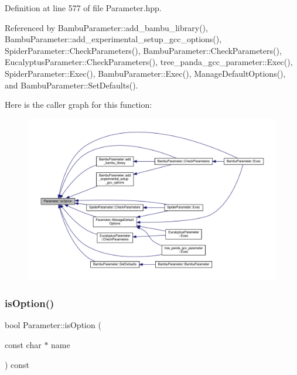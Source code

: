 Definition at line 577 of file Parameter.\+hpp.



Referenced by Bambu\+Parameter\+::add\+\_\+bambu\+\_\+library(), Bambu\+Parameter\+::add\+\_\+experimental\+\_\+setup\+\_\+gcc\+\_\+options(), Spider\+Parameter\+::\+Check\+Parameters(), Bambu\+Parameter\+::\+Check\+Parameters(), Eucalyptus\+Parameter\+::\+Check\+Parameters(), tree\+\_\+panda\+\_\+gcc\+\_\+parameter\+::\+Exec(), Spider\+Parameter\+::\+Exec(), Bambu\+Parameter\+::\+Exec(), Manage\+Default\+Options(), and Bambu\+Parameter\+::\+Set\+Defaults().

Here is the caller graph for this function\+:
\nopagebreak
\begin{figure}[H]
\begin{center}
\leavevmode
\includegraphics[width=350pt]{dc/dab/classParameter_afa6f9cfedd547207f6742a0cd51eacfa_icgraph}
\end{center}
\end{figure}
\mbox{\label{classParameter_a9079cdc924a2c4bde09c75daafc38cdf}} 
\subsubsection{\texorpdfstring{is\+Option()}{isOption()}\hspace{0.1cm}{\footnotesize\ttfamily [2/3]}}
{\footnotesize\ttfamily bool Parameter\+::is\+Option (\begin{DoxyParamCaption}\item[{const char $\ast$}]{name }\end{DoxyParamCaption}) const\hspace{0.3cm}{\ttfamily [inline]}}



